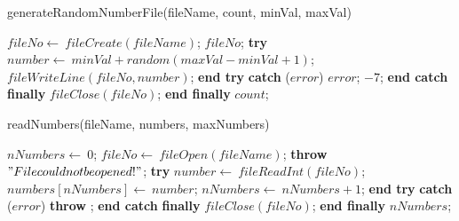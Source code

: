 \documentclass[a4paper,10pt]{article}
\begin{document}
\begin{algorithm}
\caption{generateRandomNumberFile(fileName, count, minVal, maxVal)}
\begin{algorithmic}[5]

\STATE {}
\STATE {}
\STATE {}
\STATE {}
  \STATE \(fileNo\gets\ fileCreate(fileName)\);
    \RETURN\(fileNo\);
  \ENDIF
  \STATE \textbf{try}  \BODY
      \STATE \(number\gets\ minVal+random(maxVal-minVal+1)\);
      \STATE \(fileWriteLine(fileNo,number)\);
    \ENDFOR
  \ENDBODY \STATE \textbf{end try}
  \STATE \textbf{catch} (\(error\)) \BODY
    \PRINT\(error\);
    \RETURN\(-7\);
  \ENDBODY \STATE \textbf{end catch}
  \STATE \textbf{finally} \BODY
    \STATE \(fileClose(fileNo)\);
  \ENDBODY \STATE \textbf{end finally}
  \RETURN\(count\);

\end{algorithmic}
\end{algorithm}


\begin{algorithm}
\caption{readNumbers(fileName, numbers, maxNumbers)}
\begin{algorithmic}[5]

\STATE {}
\STATE {}
\STATE {}
  \STATE \(nNumbers\gets\ 0\);
  \STATE \(fileNo\gets\ fileOpen(fileName)\);
    \STATE \textbf{throw} \("File could not be opened!"\);
  \ENDIF
  \STATE \textbf{try}  \BODY
      \STATE \(number\gets\ fileReadInt(fileNo)\);
      \STATE \(numbers[nNumbers]\gets\ number\);
      \STATE \(nNumbers\gets\ nNumbers+1\);
    \ENDWHILE
  \ENDBODY \STATE \textbf{end try}
  \STATE \textbf{catch} (\(error\)) \BODY
    \STATE \textbf{throw} \(\);
  \ENDBODY \STATE \textbf{end catch}
  \STATE \textbf{finally} \BODY
    \STATE \(fileClose(fileNo)\);
  \ENDBODY \STATE \textbf{end finally}
  \RETURN\(nNumbers\);

\end{algorithmic}
\end{algorithm}
\end{document}
